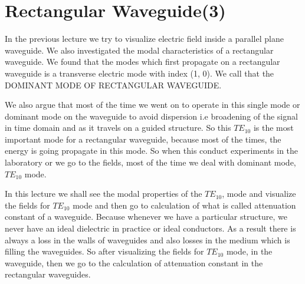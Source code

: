 \chapter{Rectangular Waveguide(3)}
In the previous lecture we try to visualize electric field inside a parallel plane waveguide. We also investigated the modal characteristics of a rectangular waveguide. We found that the modes which first propagate on a rectangular waveguide is a transverse electric mode with index (1, 0). We call that the DOMINANT MODE OF RECTANGULAR WAVEGUIDE. 
	
We also argue that most of the time we went on to operate in this single mode or dominant mode on the waveguide to avoid dispersion i.e broadening of the signal in time domain and as it travels on a guided structure. So this $TE_{10}$  is the most important mode for a rectangular waveguide, because most of the times, the energy is going propagate in this mode. So when this conduct experiments in the laboratory or we go to the fields, most of the time we deal with dominant mode,  $TE_{10}$ mode.


In this lecture we shall see the modal properties of the $TE_{10}$, mode and visualize the fields for $TE_{10}$ mode and then go to  calculation of what is called attenuation constant of  a waveguide. Because whenever we have a particular structure, we never have an
ideal dielectric in practice or ideal conductors. As a result there is always a loss in the walls of waveguides and also losses in the medium which is filling the waveguides.
So after visualizing the fields for $TE_{10}$ mode, in the waveguide, then we go to the calculation of attenuation constant in the rectangular waveguides.

